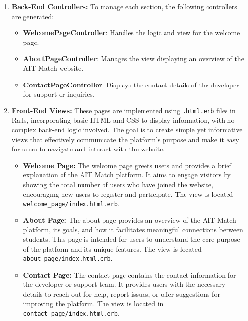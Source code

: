 \begin{enumerate}
    \item \textbf{Back-End Controllers:} 
    To manage each section, the following controllers are generated:
    \begin{itemize}
        \item \textbf{WelcomePageController}: Handles the logic and view for the welcome page.
        \item \textbf{AboutPageController}: Manages the view displaying an overview of the AIT Match website.
        \item \textbf{ContactPageController}: Displays the contact details of the developer for support or inquiries.
    \end{itemize}\bigskip
    
    \item \textbf{Front-End Views:} 
    These pages are implemented using \texttt{.html.erb} files in Rails, incorporating basic HTML and CSS to display information, with no complex back-end logic involved. The goal is to create simple yet informative views that effectively communicate the platform's purpose and make it easy for users to navigate and interact with the website.
    
    \begin{itemize}
        \item \textbf{Welcome Page:} The welcome page greets users and provides a brief explanation of the AIT Match platform. It aims to engage visitors by showing the total number of users who have joined the website, encouraging new users to register and participate. The view is located \texttt{welcome\_page/index.html.erb}.
    
        \item \textbf{About Page:} The about page provides an overview of the AIT Match platform, its goals, and how it facilitates meaningful connections between students. This page is intended for users to understand the core purpose of the platform and its unique features. The view is located \texttt{about\_page/index.html.erb}.
    
        \item \textbf{Contact Page:} The contact page contains the contact information for the developer or support team. It provides users with the necessary details to reach out for help, report issues, or offer suggestions for improving the platform. The view is located in \texttt{contact\_page/index.html.erb}.
    \end{itemize}\bigskip

\end{enumerate}
